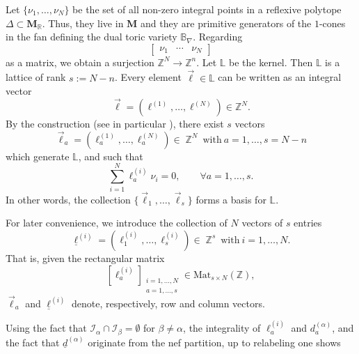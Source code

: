 \documentclass[12pt,a4paper,oneside]{amsart}
\numberwithin{equation}{section}
\theoremstyle{definition}
\theoremstyle{remark}
\DeclareMathOperator{\Z}{\mathbb{Z}}
\newcommand{\bM}{\mathbf{M}}
\begin{document}
Let \(\{\nu_{1},\ldots,\nu_{N}\}\) be
the set of all non-zero integral points in a reflexive polytope
\(\Delta\subset\bM_{\mathbb{R}}\).
Thus, they live in \(\mathbf{M}\) and they are
primitive generators of the \(1\)-cones 
in the fan defining the dual toric variety \(\mathbb{B}_{\nabla}\).
Regarding 
\begin{equation*}
    \begin{bmatrix}
        \nu_{1} & \cdots & \nu_{N}
    \end{bmatrix}
\end{equation*}
as a matrix, we obtain a surjection \(\mathbb{Z}^{N}\to\mathbb{Z}^{n}\).
Let \(\mathbb{L}\) be the kernel. Then 
\(\mathbb{L}\) is a lattice of rank \(s:=N-n\).
Every element \(\vec{\ell}\in\mathbb{L}\) can be written as an integral vector
\begin{equation*}
    \vec{\ell} = (\ell^{(1)},\ldots,\ell^{(N)})\in\mathbb{Z}^{N}.
\end{equation*}
By the construction (see in particular \cite{Hosono:1995bm}), 
there exist $s$ vectors
\begin{equation*}
	\vec{\ell}_a = (\ell_a ^{(1)} , \dots, \ell_a ^{(N)} ) \in \Z^{N}~\mbox{with}~a=1, \dots, s=N-n
\end{equation*}
which generate \(\mathbb{L}\), and such that 
\begin{equation*}
	\sum_{i=1}^{N} \ell_a ^{(i)} \nu_{i} =0  , \qquad \forall a=1, \dots, s .
\end{equation*}
In other words, the collection $\{ \vec{\ell}_1,\ldots,\vec{\ell}_s\}$ forms
a basis for \(\mathbb{L}\). \par
For later convenience, we introduce the collection of $N$ vectors of $s$ entries
\begin{equation}
\label{eq:ellweights}
	\underline{\ell}^{(i)} = (\ell_1 ^{(i)} , \dots, \ell_s ^{(i)} ) \in \Z^{s}~\mbox{with}~i=1, \dots, N .
\end{equation}
That is, given the rectangular matrix 
$$\left[\ell^{(i)}_{a} \right]_{\substack{i=1, \dots, N \\ a=1, \dots, s}}\in\mathrm{Mat}_{s\times N}(\mathbb{Z}),$$ 
$\vec{\ell}_a$ and $\underline{\ell}^{(i)}$ denote, respectively, row and column vectors.\par
Using the fact that $\mathcal{I}_{\alpha} \cap \mathcal{I}_{\beta} = \emptyset$ for $\beta \ne \alpha$, the integrality of $\ell_a^{(i)}$ and $d_a ^{(\alpha)}$, and the fact that $\underline{d} ^{(\alpha)}$ originate from the nef partition, up to relabeling one shows 
\end{document}
